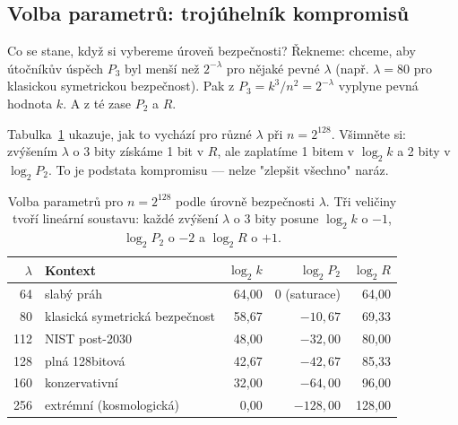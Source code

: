 \documentclass[11pt,a4paper]{article}
\begin{document}
\subsection{Volba parametrů: trojúhelník kompromisů}\label{pop:lambda-table}

Co se stane, když si vybereme úroveň bezpečnosti? Řekneme: chceme, aby útočníkův úspěch $P_3$ byl menší než $2^{-\lambda}$ pro nějaké pevné $\lambda$ (např. $\lambda = 80$ pro klasickou symetrickou bezpečnost). Pak z $P_3 = k^3 / n^2 = 2^{-\lambda}$ vyplyne pevná hodnota $k$. A z té zase $P_2$ a $R$.

Tabulka~\ref{tab:pop-lambda} ukazuje, jak to vychází pro různé $\lambda$ při $n = 2^{128}$. Všimněte si: zvýšením $\lambda$ o 3 bity získáme 1 bit v $R$, ale zaplatíme 1 bitem v $\log_2 k$ a 2 bity v $\log_2 P_2$. To je podstata kompromisu --- nelze "zlepšit všechno" naráz.

\begin{table}[ht]
\centering
\small
\begin{tabular}{rlrrr}
\toprule
$\lambda$ & Kontext & $\log_2 k$ & $\log_2 P_2$ & $\log_2 R$ \\
\midrule
64 & slabý práh & 64{,}00 & 0 (saturace) & 64{,}00 \\
80 & klasická symetrická bezpečnost & 58{,}67 & $-10{,}67$ & 69{,}33 \\
112 & NIST post-2030 & 48{,}00 & $-32{,}00$ & 80{,}00 \\
128 & plná 128bitová & 42{,}67 & $-42{,}67$ & 85{,}33 \\
160 & konzervativní & 32{,}00 & $-64{,}00$ & 96{,}00 \\
256 & extrémní (kosmologická) & 0{,}00 & $-128{,}00$ & 128{,}00 \\
\bottomrule
\end{tabular}
\caption{Volba parametrů pro $n = 2^{128}$ podle úrovně bezpečnosti $\lambda$. Tři veličiny tvoří lineární soustavu: každé zvýšení $\lambda$ o 3 bity posune $\log_2 k$ o $-1$, $\log_2 P_2$ o $-2$ a $\log_2 R$ o $+1$.}
\label{tab:pop-lambda}
\end{table}
\end{document}
